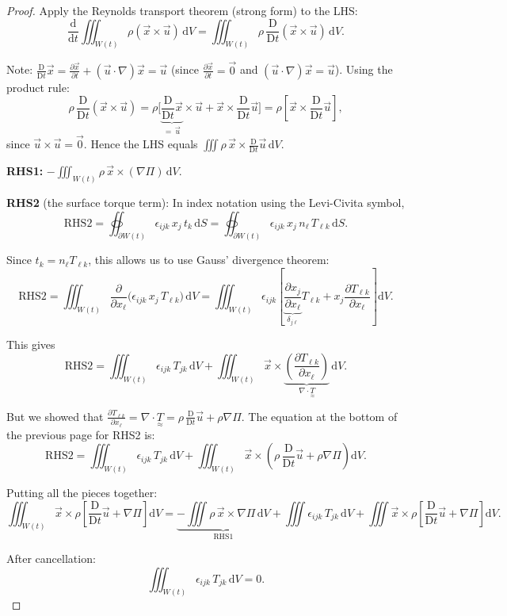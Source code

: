 \documentclass[11pt,a4paper]{article}
\newcommand{\D}{\mathrm{D}}
\newcommand{\Dt}{\frac{\D}{\D t}}
\newcommand{\pdx}[2]{\frac{\partial #1}{\partial #2}}
\newcommand{\xv}{\vec{x}}
\newcommand{\uv}{\vec{u}}
\newcommand{\tens}[1]{\underset{\approx}{#1}}
\begin{document}
\begin{proof}
Apply the Reynolds transport theorem (strong form) to the LHS:
\[
    \frac{\mathrm{d}}{\mathrm{d}t}\iiint_{W(t)} \rho(\xv \times \uv)\,\mathrm{d}V
    = \iiint_{W(t)} \rho\,\Dt (\xv \times \uv)\,\mathrm{d}V.
\]

Note: $\Dt\xv = \frac{\partial \xv}{\partial t} + (\uv\cdot\nabla)\xv = \uv$ (since $\frac{\partial \xv}{\partial t} = \vec{0}$ and $(\uv\cdot\nabla)\xv = \uv$). Using the product rule:
\[
    \rho\,\Dt(\xv \times \uv) = \rho\bigl[\underbrace{\Dt\xv}_{=\,\uv} \times \uv + \xv \times \Dt\uv\bigr]
    = \rho\left[\xv \times \Dt\uv\right],
\]
since $\uv \times \uv = \vec{0}$. Hence the LHS equals $\iiint \rho\,\xv \times \Dt\uv\,\mathrm{d}V$.

\textbf{RHS1:} $-\iiint_{W(t)} \rho\,\xv \times (\nabla\Pi)\,\mathrm{d}V$.

\textbf{RHS2} (the surface torque term): In index notation using the Levi-Civita symbol,
\[
    \text{RHS2} = \oiint_{\partial W(t)} \epsilon_{ijk}\, x_j\, t_k \,\mathrm{d}S
    = \oiint_{\partial W(t)} \epsilon_{ijk}\, x_j\, n_\ell\, T_{\ell k}\,\mathrm{d}S.
\]

Since $t_k = n_\ell T_{\ell k}$, this allows us to use Gauss' divergence theorem:
\[
    \text{RHS2} = \iiint_{W(t)} \pdx{}{x_\ell}\bigl(\epsilon_{ijk}\, x_j\, T_{\ell k}\bigr)\,\mathrm{d}V
    = \iiint_{W(t)} \epsilon_{ijk}\left[\underbrace{\pdx{x_j}{x_\ell}}_{\delta_{j\ell}} T_{\ell k} + x_j \pdx{T_{\ell k}}{x_\ell}\right]\mathrm{d}V.
\]

This gives
\[
    \text{RHS2} = \iiint_{W(t)} \epsilon_{ijk}\, T_{jk}\,\mathrm{d}V + \iiint_{W(t)} \xv \times \underbrace{\left(\pdx{T_{\ell k}}{x_\ell}\right)}_{\nabla\cdot\tens{T}}\,\mathrm{d}V.
\]

But we showed that $\pdx{T_{\ell k}}{x_\ell} = \nabla\cdot\tens{T} = \rho\,\Dt\uv + \rho\nabla\Pi$. The equation at the bottom of the previous page for RHS2 is:
\[
    \text{RHS2} = \iiint_{W(t)} \epsilon_{ijk}\, T_{jk}\,\mathrm{d}V + \iiint_{W(t)} \xv \times \left(\rho\,\Dt\uv + \rho\nabla\Pi\right)\mathrm{d}V.
\]

Putting all the pieces together:
\[
    \iiint_{W(t)} \xv \times \rho\left[\Dt\uv + \nabla\Pi\right]\mathrm{d}V
    = \underbrace{-\iiint \rho\,\xv\times\nabla\Pi\,\mathrm{d}V}_{\text{RHS1}} + \iiint \epsilon_{ijk}\,T_{jk}\,\mathrm{d}V + \iiint \xv \times \rho\left[\Dt\uv + \nabla\Pi\right]\mathrm{d}V.
\]

After cancellation:
\[
    \iiint_{W(t)} \epsilon_{ijk}\, T_{jk}\,\mathrm{d}V = 0.
\]


\end{proof}
\end{document}
